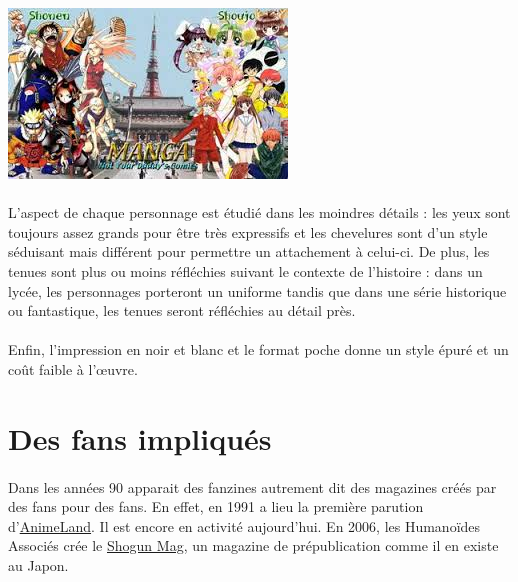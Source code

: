 \begin{center}
	\includegraphics[scale=0.8]{shojo-shonen.jpg}
\end{center}

\paragraph{} L’aspect de chaque personnage est étudié dans les moindres détails
: les yeux sont toujours assez grands pour être très expressifs et les
chevelures sont d’un style séduisant mais différent pour permettre un
attachement à celui-ci. De plus, les tenues sont plus ou moins réfléchies
suivant le contexte de l’histoire : dans un lycée, les personnages porteront un
uniforme tandis que dans une série historique ou fantastique, les tenues seront
réfléchies au détail près. 

\paragraph{} Enfin, l’impression en noir et blanc et le format poche donne un
style épuré et un coût faible à l’œuvre. 

\section{Des fans impliqués}

\paragraph{} Dans les années 90 apparait des fanzines autrement dit des
magazines créés par des fans pour des fans. En effet, en 1991 a lieu la
première parution d’\underline{AnimeLand}. Il est encore en activité
aujourd’hui. En 2006, les Humanoïdes Associés crée le \underline{Shogun Mag},
un magazine de prépublication comme il en existe au Japon. 

